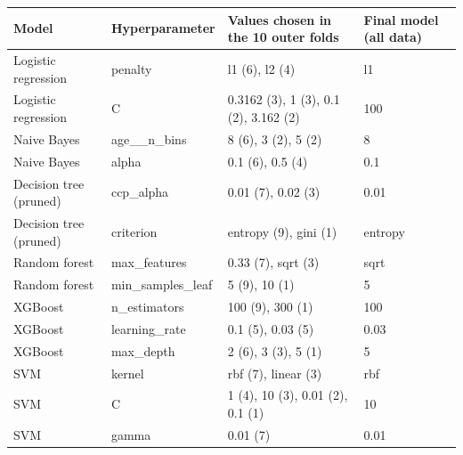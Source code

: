 \begin{tabular}{llp{7cm}l}
\toprule
\textbf{Model} & \textbf{Hyperparameter} & \textbf{Values chosen in the 10 outer folds} & \textbf{Final model (all data)} \\
\midrule
Logistic regression & penalty & l1 (6), l2 (4) & l1 \\
Logistic regression & C & 0.3162 (3), 1 (3), 0.1 (2), 3.162 (2) & 100 \\
Naive Bayes & age\_\_n\_bins & 8 (6), 3 (2), 5 (2) & 8 \\
Naive Bayes & alpha & 0.1 (6), 0.5 (4) & 0.1 \\
Decision tree (pruned) & ccp\_alpha & 0.01 (7), 0.02 (3) & 0.01 \\
Decision tree (pruned) & criterion & entropy (9), gini (1) & entropy \\
Random forest & max\_features & 0.33 (7), sqrt (3) & sqrt \\
Random forest & min\_samples\_leaf & 5 (9), 10 (1) & 5 \\
XGBoost & n\_estimators & 100 (9), 300 (1) & 100 \\
XGBoost & learning\_rate & 0.1 (5), 0.03 (5) & 0.03 \\
XGBoost & max\_depth & 2 (6), 3 (3), 5 (1) & 5 \\
SVM & kernel & rbf (7), linear (3) & rbf \\
SVM & C & 1 (4), 10 (3), 0.01 (2), 0.1 (1) & 10 \\
SVM & gamma & 0.01 (7) & 0.01 \\
\bottomrule
\end{tabular}
